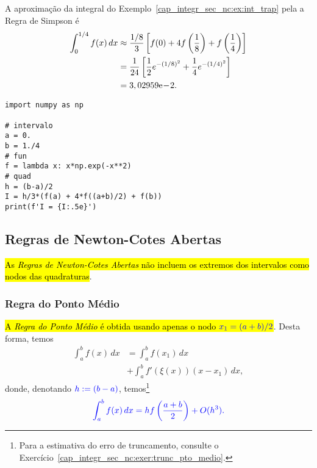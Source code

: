 \begin{ex}\label{cap_integr_sec_nc:ex:int_simp}
  A aproximação da integral do Exemplo~\ref{cap_integr_sec_nc:ex:int_trap} pela a Regra de Simpson é
  \begin{subequations}
    \begin{align}
      \int_0^{1/4} f(x)\,dx &\approx \frac{1/8}{3}\left[f(0) + 4f\left(\frac{1}{8}\right) + f\left(\frac{1}{4}\right)\right]\\
                            &= \frac{1}{24}\left[\frac{1}{2}e^{-(1/8)^2} + \frac{1}{4}e^{-(1/4)^2}\right]\\
                            &= 3,02959\mathrm{e}\!-\!2.
  \end{align}
\end{subequations}

\begin{lstlisting}
import numpy as np

# intervalo
a = 0.
b = 1./4
# fun
f = lambda x: x*np.exp(-x**2)
# quad
h = (b-a)/2
I = h/3*(f(a) + 4*f((a+b)/2) + f(b))
print(f'I = {I:.5e}')
\end{lstlisting}
\end{ex}

\subsection{Regras de Newton-Cotes Abertas}

\hl{As \emph{Regras de Newton-Cotes Abertas} não incluem os extremos dos intervalos como nodos das quadraturas}.

\subsubsection{Regra do Ponto Médio}

\hl{A \emph{Regra do Ponto Médio} é obtida usando apenas o nodo $\color{blue}x_1=(a+b)/2$}. Desta forma, temos
\begin{equation}
  \begin{aligned}
    \int_a^b f(x)\,dx &= \int_a^b f(x_1)\,dx\\
    &+ \int_a^b f'(\xi(x))(x-x_1)\,dx,
  \end{aligned}
\end{equation}
donde, denotando $\color{blue}h:=(b-a)$, temos\footnote{Para a estimativa do erro de truncamento, consulte o Exercício~\ref{cap_integr_sec_nc:exer:trunc_pto_medio}.}
\begin{equation}\color{blue}\int_a^b f(x)\,dx = hf\left(\frac{a+b}{2}\right) + O(h^3).
\end{equation}

